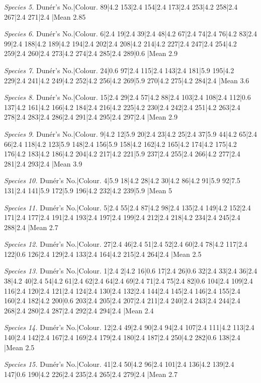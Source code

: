 \documentclass[a4paper, 12pt, oneside, polutonikogreek, english]{article}
\begin{document}
\emph{Species 5.} 
Dunér's No.|Colour. 
89|4.2 
153|2.4 
154|2.4 
173|2.4 
253|4.2 
258|2.4 
267|2.4 
271|2.4 
|Mean 2.85 

\emph{Species 6.} 
Dunér's No.|Colour. 
6|2.4 
19|2.4 
39|2.4 
48|4.2 
67|2.4 
74|2.4 
76|4.2 
83|2.4 
99|2.4 
188|4.2 
189|4.2 
194|2.4 
202|2.4 
208|4.2 
214|4.2 
227|2.4 
247|2.4 
254|4.2 
259|2.4 
260|2.4 
273|4.2 
274|2.4 
285|2.4 
289|0.6 
|Mean 2.9 

\emph{Species 7.} 
Dunér's No.|Colour. 
24|0.6 
97|2.4 
115|2.4 
143|2.4 
181|5.9 
195|4.2 
229|2.4 
241|4.2 
249|4.2 
252|4.2 
256|4.2 
269|5.9 
270|4.2 
275|4.2 
284|2.4 
|Mean 3.6 

\emph{Species 8.} 
Dunér's No.|Colour. 
15|2.4 
29|2.4 
57|4.2 
88|2.4 
103|2.4 
108|2.4 
112|0.6 
137|4.2 
161|4.2 
166|4.2 
184|2.4 
216|4.2 
225|4.2 
230|2.4 
242|2.4 
251|4.2 
263|2.4 
278|2.4 
283|2.4 
286|2.4 
291|2.4 
295|2.4 
297|2.4 
|Mean 2.9 

\emph{Species 9.} 
Dunér's No.|Colour. 
9|4.2 
12|5.9 
20|2.4 
23|4.2 
25|2.4 
37|5.9 
44|4.2 
65|2.4 
66|2.4 
118|4.2 
123|5.9 
148|2.4 
156|5.9 
158|4.2 
162|4.2 
165|4.2 
174|4.2 
175|4.2 
176|4.2 
183|4.2 
186|4.2 
204|4.2 
217|4.2 
221|5.9 
237|2.4 
255|2.4 
266|4.2 
277|2.4 
281|2.4 
293|2.4 
|Mean 3.9 

\emph{Species 10.} 
Dunér's No.|Colour. 
4|5.9 
18|4.2 
28|4.2 
30|4.2 
86|4.2 
91|5.9 
92|7.5 
131|2.4 
141|5.9 
172|5.9 
196|4.2 
232|4.2 
239|5.9 
|Mean 5 

\emph{Species 11.} 
Dunér's No.|Colour. 
5|2.4 
55|2.4 
87|4.2 
98|2.4 
135|2.4 
149|4.2 
152|2.4 
171|2.4 
177|2.4 
191|2.4 
193|2.4 
197|2.4 
199|2.4 
212|2.4 
218|4.2 
234|2.4 
245|2.4 
288|2.4 
|Mean 2.7 

\emph{Species 12.} 
Dunér's No.|Colour. 
27|2.4 
46|2.4 
51|2.4 
52|2.4 
60|2.4 
78|4.2 
117|2.4 
122|0.6 
126|2.4 
129|2.4 
133|2.4 
164|4.2 
215|2.4 
264|2.4 
|Mean 2.5

\emph{Species 13.} 
Dunér's No.|Colour. 
1|2.4 
2|4.2 
16|0.6 
17|2.4 
26|0.6 
32|2.4 
33|2.4 
36|2.4 
38|4.2 
40|2.4 
54|4.2 
61|2.4 
62|2.4 
64|2.4 
69|2.4 
71|2.4 
75|2.4 
82|0.6 
104|2.4 
109|2.4 
116|2.4 
120|2.4 
121|2.4 
124|2.4 
130|2.4 
132|2.4 
144|2.4 
145|2.4 
146|2.4 
155|2.4 
160|2.4 
182|4.2 
200|0.6 
203|2.4 
205|2.4 
207|2.4 
211|2.4 
240|2.4 
243|2.4 
244|2.4 
268|2.4 
280|2.4 
287|2.4 
292|2.4 
294|2.4 
|Mean 2.4

\emph{Species 14.} 
Dunér's No.|Colour. 
12|2.4 
49|2.4 
90|2.4 
94|2.4 
107|2.4 
111|4.2 
113|2.4 
140|2.4 
142|2.4 
167|2.4 
169|2.4 
179|2.4 
180|2.4 
187|2.4 
250|4.2 
282|0.6 
138|2.4 
|Mean 2.5

\emph{Species 15.} 
Dunér's No.|Colour. 
41|2.4 
50|4.2 
96|2.4 
101|2.4 
136|4.2 
139|2.4 
147|0.6 
190|4.2 
226|2.4 
235|2.4 
265|2.4 
279|2.4 
|Mean 2.7 
\end{document}

